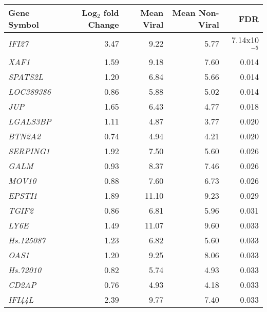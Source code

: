 \begin{center}
\begin{table}[htbp]
\begin{tabular}{@{} l r r r r}
\toprule
\textbf{Gene Symbol} & \textbf{Log$_{2}$ fold Change} & \textbf{Mean Viral} & \textbf{Mean Non-Viral} & \textbf{FDR} \\
\midrule
\textit{IFI27}       & 3.47                      & 9.22     & 5.77         & 7.14x10$^{-5}$     \\
\textit{XAF1}        & 1.59                      & 9.18     & 7.60         & 0.014        \\
\textit{SPATS2L}     & 1.20                      & 6.84     & 5.66         & 0.014        \\
\textit{LOC389386}   & 0.86                      & 5.88     & 5.02         & 0.014        \\
\textit{JUP}         & 1.65                      & 6.43     & 4.77         & 0.018        \\
\textit{LGALS3BP}    & 1.11                      & 4.87     & 3.77         & 0.020        \\
\textit{BTN2A2}      & 0.74                      & 4.94     & 4.21         & 0.020        \\
\textit{SERPING1}    & 1.92                      & 7.50     & 5.60         & 0.026        \\
\textit{GALM}        & 0.93                      & 8.37     & 7.46         & 0.026        \\
\textit{MOV10}       & 0.88                      & 7.60     & 6.73         & 0.026        \\
\textit{EPSTI1}      & 1.89                      & 11.10    & 9.23         & 0.029        \\
\textit{TGIF2}       & 0.86                      & 6.81     & 5.96         & 0.031        \\
\textit{LY6E}        & 1.49                      & 11.07    & 9.60         & 0.033        \\
\textit{Hs.125087}   & 1.23                      & 6.82     & 5.60         & 0.033        \\
\textit{OAS1}        & 1.20                      & 9.25     & 8.06         & 0.033        \\
\textit{Hs.72010}    & 0.82                      & 5.74     & 4.93         & 0.033        \\
\textit{CD2AP}       & 0.76                      & 4.93     & 4.18         & 0.033        \\
\textit{IFI44L}      & 2.39                      & 9.77     & 7.40         & 0.033        \\

\end{tabular}
\end{table}
\end{center}
